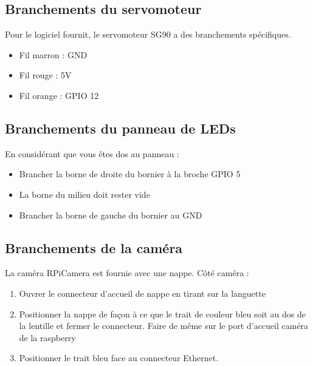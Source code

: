 \subsection{Branchements du servomoteur}

Pour le logiciel fournit, le servomoteur \gls{SG90} a des branchements spécifiques.
\begin{itemize}
    \item Fil marron : GND
    \item Fil rouge  : 5V
    \item Fil orange : GPIO 12
\end{itemize}

\subsection{Branchements du panneau de LEDs}

En considérant que vous êtes dos au panneau :
\begin{itemize}
    \item Brancher la borne de droite du bornier à la broche GPIO 5
    \item La borne du milieu doit rester vide
    \item Brancher la borne de gauche du bornier au GND
\end{itemize}

\subsection{Branchements de la caméra}

La caméra \gls{RPiCamera} est fournie avec une nappe. Côté caméra :

\begin{enumerate}
    \item Ouvrer le connecteur d'accueil de nappe en tirant sur la languette
    \item Positionner la nappe de façon à ce que le trait de couleur bleu soit au dos de la lentille et fermer le
          connecteur. Faire de même sur le port d'accueil caméra de la \gls{raspberry}
    \item Positionner le trait bleu face au connecteur Ethernet.
\end{enumerate}
